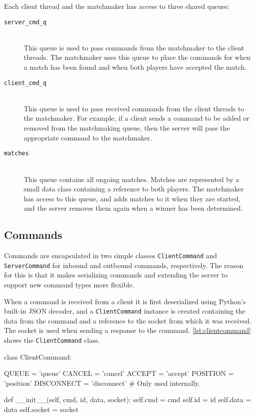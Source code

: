Each client thread and the matchmaker has access to three shared queues:

\begin{description}
	\item[\texttt{server\_cmd\_q}] \hfill \\
		This queue is used to pass commands from the matchmaker to the client threads.
		The matchmaker uses this queue to place the commands for when a match has been found and when both players have accepted the match.
	\item[\texttt{client\_cmd\_q}] \hfill \\
		This queue is used to pass received commands from the client threads to the matchmaker.
		For example, if a client sends a command to be added or removed from the matchmaking queue, then the server will pass the appropriate command to the matchmaker.
	\item[\texttt{matches}] \hfill \\
		This queue contains all ongoing matches.
		Matches are represented by a small data class containing a reference to both players.
		The matchmaker has access to this queue, and adds matches to it when they are started, and the server removes them again when a winner has been determined.
\end{description}

\subsection{Commands}
Commands are encapsulated in two simple classes \texttt{Client\-Command} and \texttt{Server\-Command} for inbound and outbound commands, respectively.
The reason for this is that it makes serializing commands and extending the server to support new command types more flexible.

When a command is received from a client it is first deserialized using Python's built-in JSON decoder, and a \texttt{Client\-Command} instance is created containing the data from the command and a reference to the socket from which it was received.
The socket is used when sending a response to the command.
\autoref{lst:clientcommand} shows the \texttt{Client\-Command} class.

\begin{code}[language={Python}, caption={\texttt{ClientCommand} Class}, label={lst:clientcommand}]
class ClientCommand:

	QUEUE = 'queue'
	CANCEL = 'cancel'
	ACCEPT = 'accept'
	POSITION = 'position'
	DISCONNECT = 'disconnect' # Only used internally.

	def __init__(self, cmd, id, data, socket):
		self.cmd = cmd
		self.id = id
		self.data = data
		self.socket = socket
\end{code}

